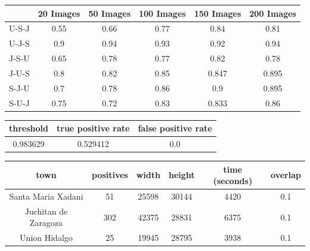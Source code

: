 \begin{center}
  \begin{tabular}{|c|c|c|c|c|c|}
    \hline
         &20 Images &50 Images &100 Images&150 Images&200 Images\\ \hline
    U-S-J&0.55      &0.66      &0.77      &0.84      &0.81      \\ \hline
    U-J-S&0.9       &0.94      &0.93      &0.92      &0.94      \\ \hline
    J-S-U&0.65      &0.78      &0.77      &0.82      &0.78      \\ \hline
    J-U-S&0.8       &0.82      &0.85      &0.847     &0.895     \\ \hline
    S-J-U&0.7       &0.78      &0.86      &0.9       &0.895     \\ \hline
    S-U-J&0.75      &0.72      &0.83      &0.833     &0.86      \\
     
    \hline
  \end{tabular}
\end{center}





\begin{center}
  \begin{tabular}{|c|c|c|}
    \hline
    threshold & true positive rate & false positive rate \\ \hline
    0.983629 & 0.529412 & 0.0 \\
    \hline
  \end{tabular}
\end{center}




\begin{center}
  \begin{tabular}{|c|c|c|c|c|c|}
    \hline
    town                 & positives & width & height & time (seconds) & overlap\\ \hline
    Santa Maria Xadani   &51         & 25598 & 30144  & 4420           & 0.1 \\ \hline
    Juchitan de Zaragoza &302        & 42375 & 28831  & 6375           & 0.1 \\ \hline
    Union Hidalgo        &25         & 19945 & 28795  & 3938           & 0.1\\
    \hline
  \end{tabular}
\end{center}




